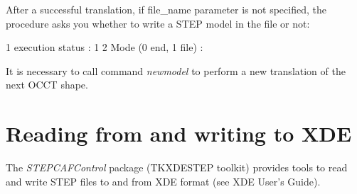 After a successful translation, if file\+\_\+name parameter is not specified, the procedure asks you whether to write a S\+T\+EP model in the file or not\+: 
\begin{DoxyCode}
1 execution status : 1 
2 Mode (0 end, 1 file) : 
\end{DoxyCode}
 It is necessary to call command {\itshape newmodel} to perform a new translation of the next O\+C\+CT shape.\hypertarget{occt_user_guides__step_occt_step_7}{}\section{Reading from and writing to X\+DE}\label{occt_user_guides__step_occt_step_7}
The {\itshape S\+T\+E\+P\+C\+A\+F\+Control} package (T\+K\+X\+D\+E\+S\+T\+EP toolkit) provides tools to read and write S\+T\+EP files to and from X\+DE format (see X\+DE User’s Guide).


